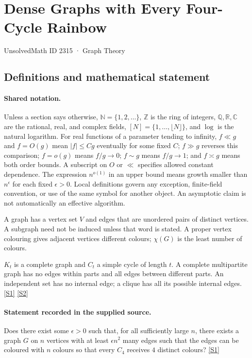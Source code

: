 \documentclass[11pt,a4paper]{article}
\newcommand{\N}{\mathbb{N}}
\newcommand{\Z}{\mathbb{Z}}
\newcommand{\Q}{\mathbb{Q}}
\newcommand{\R}{\mathbb{R}}
\newcommand{\C}{\mathbb{C}}
\newcommand{\sref}[2]{\hyperlink{source:#1:#2}{[S#2]}}
\begin{document}

\setcounter{section}{2314}

\section{Dense Graphs with Every Four-Cycle Rainbow}\label{2315}

{\small\sffamily UnsolvedMath ID 2315 · Graph Theory}

\subsection{Definitions and mathematical statement}

\paragraph{Shared notation.}Unless a section says otherwise, $\N=\{1,2,\ldots\}$,
$\Z$ is the ring of integers, $\Q,\R,\C$ are the rational, real, and complex
fields, $[N]=\{1,\ldots,\lfloor N\rfloor\}$, and $\log$ is the natural
logarithm. For real functions of a parameter tending to infinity,
$f\ll g$ and $f=O(g)$ mean $|f|\leq Cg$ eventually for some fixed $C$;
$f\gg g$ reverses this comparison; $f=o(g)$ means $f/g\to0$;
$f\sim g$ means $f/g\to1$; and $f\asymp g$ means both order bounds.
A subscript on $O$ or $\ll$ specifies allowed constant dependence.
The expression $n^{o(1)}$ in an upper bound means growth smaller than
$n^\epsilon$ for each fixed $\epsilon>0$. Local definitions govern any
exception, finite-field convention, or use of the same symbol for another
object. An asymptotic claim is not automatically an effective algorithm.



A graph has a vertex set $V$ and edges that are unordered pairs of distinct vertices. A subgraph need not be induced unless that word is stated. A proper vertex colouring gives adjacent vertices different colours; $\chi(G)$ is the least number of colours.

$K_t$ is a complete graph and $C_t$ a simple cycle of length $t$. A complete multipartite graph has no edges within parts and all edges between different parts. An independent set has no internal edge; a clique has all its possible internal edges. \sref{2315}{1} \sref{2315}{2}

\paragraph{Statement recorded in the supplied source.}
Does there exist some $\epsilon>0$ such that, for all sufficiently large $n$, there exists a graph $G$ on $n$ vertices with at least $\epsilon n^2$ many edges such that the edges can be coloured with $n$ colours so that every $C_4$ receives $4$ distinct colours? \sref{2315}{1}
\end{document}
